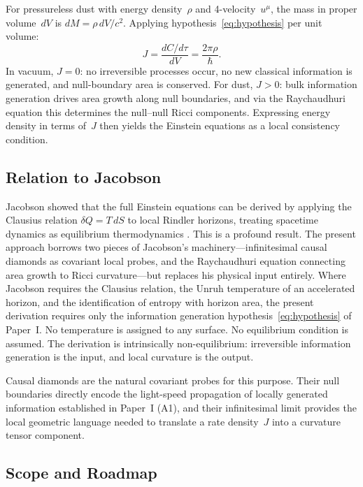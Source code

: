 \documentclass[12pt]{article}
\begin{document}
For pressureless dust with energy density~$\rho$ and
4-velocity~$u^\mu$, the mass in proper volume~$dV$ is
$dM = \rho\,dV/c^2$.
Applying hypothesis~\eqref{eq:hypothesis} per unit volume:
\begin{equation}
  J = \frac{dC/d\tau}{dV} = \frac{2\pi\rho}{\hbar}.
  \label{eq:J-dust}
\end{equation}
In vacuum, $J=0$: no irreversible processes occur, no new
classical information is generated, and null-boundary area
is conserved.
For dust, $J>0$: bulk information generation drives area growth
along null boundaries, and via the Raychaudhuri equation this
determines the null--null Ricci components.
Expressing energy density in terms of~$J$ then yields the
Einstein equations as a local consistency condition.

\subsection{Relation to Jacobson \cite{Jacobson1995}}

Jacobson showed that the full Einstein equations can be derived
by applying the Clausius relation $\delta Q = T\,dS$ to local
Rindler horizons, treating spacetime dynamics as equilibrium
thermodynamics \cite{Jacobson1995}.
This is a profound result.
The present approach borrows two pieces of Jacobson's
machinery---infinitesimal causal diamonds as covariant local
probes, and the Raychaudhuri equation connecting area growth
to Ricci curvature---but replaces his physical input entirely.
Where Jacobson requires the Clausius relation, the Unruh
temperature of an accelerated horizon, and the identification
of entropy with horizon area, the present derivation requires
only the information generation hypothesis~\eqref{eq:hypothesis}
of Paper~I.
No temperature is assigned to any surface.
No equilibrium condition is assumed.
The derivation is intrinsically non-equilibrium: irreversible
information generation is the input, and local curvature is
the output.

Causal diamonds are the natural covariant probes for this purpose.
Their null boundaries directly encode the light-speed propagation
of locally generated information established in Paper~I (A1),
and their infinitesimal limit provides the local geometric
language needed to translate a rate density~$J$ into a curvature
tensor component.

\subsection{Scope and Roadmap}
\end{document}
